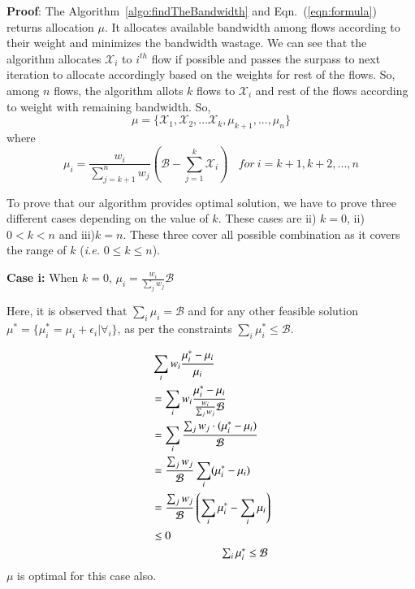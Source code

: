 {\bf Proof}: The Algorithm~\ref{algo:findTheBandwidth} and Eqn.~(\ref{eqn:formula}) returns allocation $\mu$. It allocates available bandwidth among flows according to their weight and minimizes the bandwidth wastage. We can see that the algorithm allocates $\mathcal{X}_i$ to $i^{th}$ flow if possible and passes the surpass to next iteration to allocate accordingly based on the weights for rest of the flows. So, among $n$ flows, the algorithm allots $k$ flows to $\mathcal{X}_i$ and rest of the flows according to weight with remaining bandwidth. So, $$\mu = \{\mathcal{X}_1, \mathcal{X}_2, ... \mathcal{X}_k, \mu_{k+1}, ..., \mu_{n}\}$$ where $$\mu_i = \frac{w_{i}}{\sum_{j=k+1}^{n}w_j}(\mathcal{B} - \sum_{j=1}^{k}\mathcal{X}_i) \ \ \ \ for\ i=k+1,k+2,...,n$$


To prove that our algorithm provides optimal solution, we have to prove three different cases depending on the value of $k$. These cases are ii) $k = 0$, ii) $0 < k < n$ and iii)$k = n$. These three cover all possible combination as it covers the range of $k$ ({\it i.e.} $0 \le k \le n$).

{\bf Case i:} When $k=0$, $\mu_i = \frac{w_i}{\sum_{j}w_j}\mathcal{B}$

Here, it is observed that $\sum_i \mu_i = \mathcal{B}$ and for any other feasible solution $\mu^* = \{\mu_i^* = \mu_i+\epsilon_i | \forall_i\}$, as per the constraints $\sum_i \mu_i^* \le \mathcal{B}$.



\begin{equation}
\begin{split}
&\sum_i w_i \frac{\mu_i^* - \mu_i}{\mu_i} \\
&= \sum_i w_i \frac{\mu_i^* - \mu_i}{\frac{w_i}{\sum_{j}w_j} \mathcal{B}} \\
&= \sum_i  \frac{\sum_{j}w_j \cdot (\mu_i^* - \mu_i)}{\mathcal{B}} \\
&= \frac{\sum_{j}w_j}{\mathcal{B}} \sum_i (\mu_i^* - \mu_i)\\
&= \frac{\sum_{j}w_j}{\mathcal{B}} \left( \sum_i \mu_i^* - \sum_i \mu_i \right) \\
&\le 0 \\
& \omit \hfill \text{$\sum_i \mu_i^* \le \mathcal{B}$} \\
\end{split}
\end{equation}
$\mu$ is optimal for this case also.

